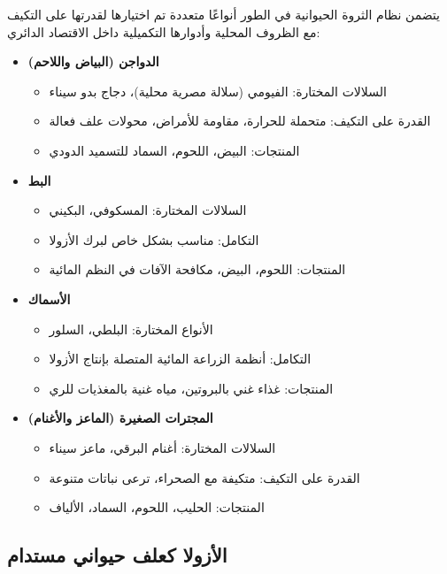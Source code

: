 يتضمن نظام الثروة الحيوانية في الطور أنواعًا متعددة تم اختيارها لقدرتها على التكيف مع الظروف المحلية وأدوارها التكميلية داخل الاقتصاد الدائري:

\begin{itemize}
    \item \textbf{الدواجن (البياض واللاحم)}
    \begin{itemize}
        \item السلالات المختارة: الفيومي (سلالة مصرية محلية)، دجاج بدو سيناء
        \item القدرة على التكيف: متحملة للحرارة، مقاومة للأمراض، محولات علف فعالة
        \item المنتجات: البيض، اللحوم، السماد للتسميد الدودي
    \end{itemize}
    
    \item \textbf{البط}
    \begin{itemize}
        \item السلالات المختارة: المسكوفي، البكيني
        \item التكامل: مناسب بشكل خاص لبرك الأزولا
        \item المنتجات: اللحوم، البيض، مكافحة الآفات في النظم المائية
    \end{itemize}
    
    \item \textbf{الأسماك}
    \begin{itemize}
        \item الأنواع المختارة: البلطي، السلور
        \item التكامل: أنظمة الزراعة المائية المتصلة بإنتاج الأزولا
        \item المنتجات: غذاء غني بالبروتين، مياه غنية بالمغذيات للري
    \end{itemize}
    
    \item \textbf{المجترات الصغيرة (الماعز والأغنام)}
    \begin{itemize}
        \item السلالات المختارة: أغنام البرقي، ماعز سيناء
        \item القدرة على التكيف: متكيفة مع الصحراء، ترعى نباتات متنوعة
        \item المنتجات: الحليب، اللحوم، السماد، الألياف
    \end{itemize}
\end{itemize}

\subsection{الأزولا كعلف حيواني مستدام}

